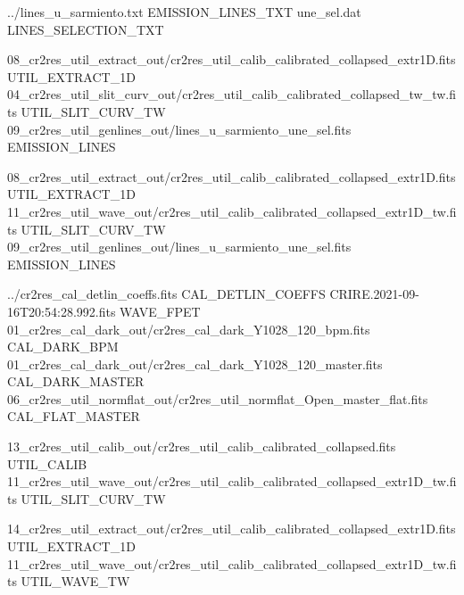 \begin{shell}[fontsize=\footnotesize]
../lines_u_sarmiento.txt EMISSION_LINES_TXT
une_sel.dat LINES_SELECTION_TXT

08_cr2res_util_extract_out/cr2res_util_calib_calibrated_collapsed_extr1D.fits UTIL_EXTRACT_1D
04_cr2res_util_slit_curv_out/cr2res_util_calib_calibrated_collapsed_tw_tw.fits UTIL_SLIT_CURV_TW
09_cr2res_util_genlines_out/lines_u_sarmiento_une_sel.fits EMISSION_LINES

08_cr2res_util_extract_out/cr2res_util_calib_calibrated_collapsed_extr1D.fits UTIL_EXTRACT_1D
11_cr2res_util_wave_out/cr2res_util_calib_calibrated_collapsed_extr1D_tw.fits UTIL_SLIT_CURV_TW
09_cr2res_util_genlines_out/lines_u_sarmiento_une_sel.fits EMISSION_LINES

../cr2res_cal_detlin_coeffs.fits CAL_DETLIN_COEFFS
CRIRE.2021-09-16T20:54:28.992.fits      WAVE_FPET
01_cr2res_cal_dark_out/cr2res_cal_dark_Y1028_120_bpm.fits CAL_DARK_BPM
01_cr2res_cal_dark_out/cr2res_cal_dark_Y1028_120_master.fits CAL_DARK_MASTER
06_cr2res_util_normflat_out/cr2res_util_normflat_Open_master_flat.fits CAL_FLAT_MASTER

13_cr2res_util_calib_out/cr2res_util_calib_calibrated_collapsed.fits UTIL_CALIB
11_cr2res_util_wave_out/cr2res_util_calib_calibrated_collapsed_extr1D_tw.fits UTIL_SLIT_CURV_TW

14_cr2res_util_extract_out/cr2res_util_calib_calibrated_collapsed_extr1D.fits UTIL_EXTRACT_1D
11_cr2res_util_wave_out/cr2res_util_calib_calibrated_collapsed_extr1D_tw.fits UTIL_WAVE_TW
\end{shell}

